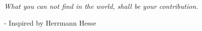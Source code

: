 \center
\emph{What you can not find in the world, shall be your contribution.}
 
- Inspired by Herrmann Hesse